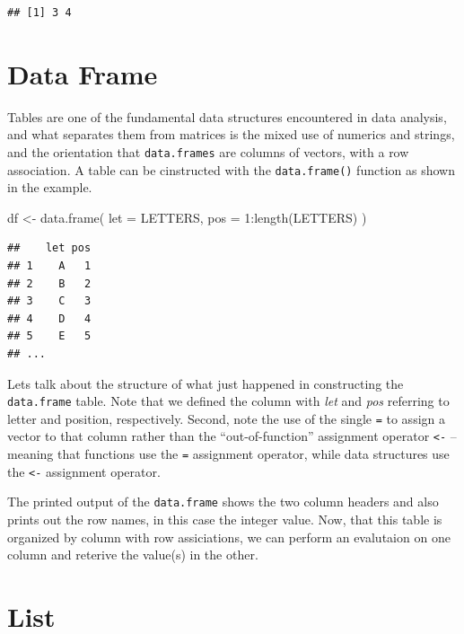 \documentclass[
]{book}
\newenvironment{Shaded}{\begin{snugshade}}{\end{snugshade}}
\newcommand{\AttributeTok}[1]{\textcolor[rgb]{0.77,0.63,0.00}{#1}}
\newcommand{\DecValTok}[1]{\textcolor[rgb]{0.00,0.00,0.81}{#1}}
\newcommand{\FunctionTok}[1]{\textcolor[rgb]{0.00,0.00,0.00}{#1}}
\newcommand{\NormalTok}[1]{#1}
\newcommand{\OtherTok}[1]{\textcolor[rgb]{0.56,0.35,0.01}{#1}}
\newcommand{\SpecialCharTok}[1]{\textcolor[rgb]{0.00,0.00,0.00}{#1}}
\begin{document}
\begin{verbatim}
## [1] 3 4
\end{verbatim}

\hypertarget{data-frame}{%
\section{Data Frame}\label{data-frame}}

Tables are one of the fundamental data structures encountered in data analysis, and what separates them from matrices is the mixed use of numerics and strings, and the orientation that \texttt{data.frames} are columns of vectors, with a row association. A table can be cinstructed with the \texttt{data.frame()} function as shown in the example.

\begin{Shaded}
\begin{Highlighting}[]
\NormalTok{df }\OtherTok{\textless{}{-}} \FunctionTok{data.frame}\NormalTok{(}
  \AttributeTok{let =}\NormalTok{ LETTERS,}
  \AttributeTok{pos =} \DecValTok{1}\SpecialCharTok{:}\FunctionTok{length}\NormalTok{(LETTERS)}
\NormalTok{)}
\end{Highlighting}
\end{Shaded}

\begin{verbatim}
##    let pos
## 1    A   1
## 2    B   2
## 3    C   3
## 4    D   4
## 5    E   5
## ...
\end{verbatim}

Lets talk about the structure of what just happened in constructing the \texttt{data.frame} table. Note that we defined the column with \emph{let} and \emph{pos} referring to letter and position, respectively. Second, note the use of the single \texttt{=} to assign a vector to that column rather than the ``out-of-function'' assignment operator \texttt{\textless{}-} -- meaning that functions use the \texttt{=} assignment operator, while data structures use the \texttt{\textless{}-} assignment operator.

The printed output of the \texttt{data.frame} shows the two column headers and also prints out the row names, in this case the integer value. Now, that this table is organized by column with row assiciations, we can perform an evalutaion on one column and reterive the value(s) in the other.

\hypertarget{list}{%
\section{List}\label{list}}
\end{document}
